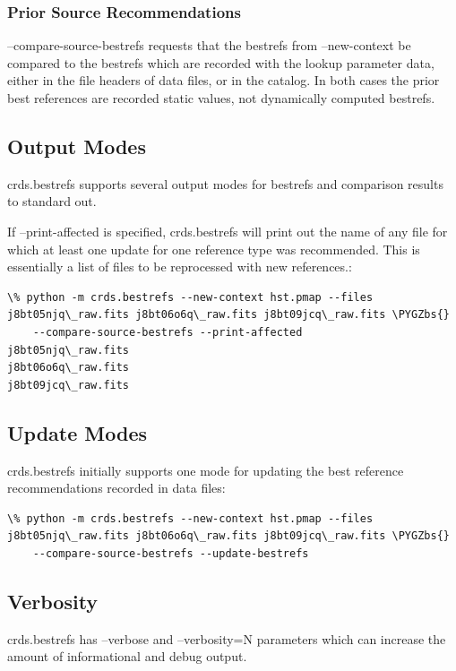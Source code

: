 \documentclass[letterpaper,10pt,english]{sphinxmanual}
\def\PYGZbs{\char`\\}
\begin{document}
\subsubsection{Prior Source Recommendations}
\label{command_line_tools:prior-source-recommendations}
--compare-source-bestrefs requests that the bestrefs from --new-context be compared to the bestrefs which are
recorded with the lookup parameter data,  either in the file headers of data files,  or in the catalog.   In both
cases the prior best references are recorded static values,  not dynamically computed bestrefs.


\subsection{Output Modes}
\label{command_line_tools:output-modes}
crds.bestrefs supports several output modes for bestrefs and comparison results to standard out.

If --print-affected is specified,  crds.bestrefs will print out the name of any file for which at least one update for
one reference type was recommended.   This is essentially a list of files to be reprocessed with new references.:

\begin{Verbatim}[commandchars=\\\{\}]
\% python -m crds.bestrefs --new-context hst.pmap --files j8bt05njq\_raw.fits j8bt06o6q\_raw.fits j8bt09jcq\_raw.fits \PYGZbs{}
    --compare-source-bestrefs --print-affected
j8bt05njq\_raw.fits
j8bt06o6q\_raw.fits
j8bt09jcq\_raw.fits
\end{Verbatim}


\subsection{Update Modes}
\label{command_line_tools:update-modes}
crds.bestrefs initially supports one mode for updating the best reference recommendations recorded in data files:

\begin{Verbatim}[commandchars=\\\{\}]
\% python -m crds.bestrefs --new-context hst.pmap --files j8bt05njq\_raw.fits j8bt06o6q\_raw.fits j8bt09jcq\_raw.fits \PYGZbs{}
    --compare-source-bestrefs --update-bestrefs
\end{Verbatim}


\subsection{Verbosity}
\label{command_line_tools:verbosity}
crds.bestrefs has --verbose and --verbosity=N parameters which can increase the amount of informational
and debug output.
\end{document}
